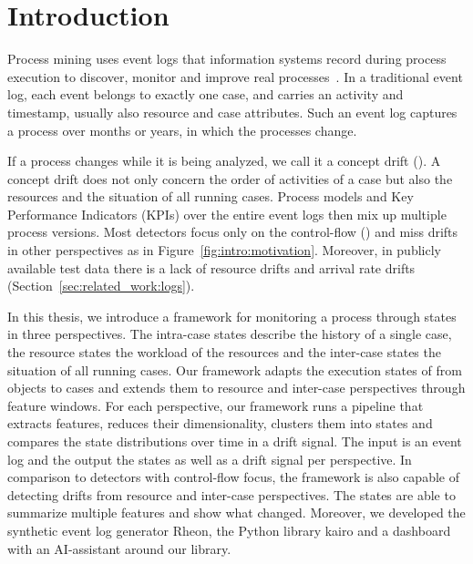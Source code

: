 \chapter{Introduction}
\label{chap:intro}
Process mining uses event logs that information systems record during process execution to discover, monitor and improve real processes~\autocite{vanderaalst2016process}. In a traditional event log, each event belongs to exactly one case, and carries an activity and timestamp, usually also resource and case attributes. Such an event log captures a process over months or years, in which the processes change.

If a process changes while it is being analyzed, we call it a concept drift (\textcite{vanderaalst2016process}). A concept drift does not only concern the order of activities of a case but also the resources and the situation of all running cases. Process models and Key Performance Indicators (KPIs) over the entire event logs then mix up multiple process versions. Most detectors focus only on the control-flow (\textcite{sato2022survey}) and miss drifts in other perspectives as in Figure~\ref{fig:intro:motivation}. Moreover, in publicly available test data there is a lack of resource drifts and arrival rate drifts (Section~\ref{sec:related_work:logs}).

In this thesis, we introduce a framework for monitoring a process through states in three perspectives. The intra-case states describe the history of a single case, the resource states the workload of the resources and the inter-case states the situation of all running cases. Our framework adapts the execution states of \textcite{berti2025ocel} from objects to cases and extends them to resource and inter-case perspectives through feature windows. For each perspective, our framework runs a pipeline that extracts features, reduces their dimensionality, clusters them into states and compares the state distributions over time in a drift signal. The input is an event log and the output the states as well as a drift signal per perspective. In comparison to detectors with control-flow focus, the framework is also capable of detecting drifts from resource and inter-case perspectives. The states are able to summarize multiple features and show what changed. Moreover, we developed the synthetic event log generator Rheon, the Python library kairo and a dashboard with an AI-assistant around our library. 


